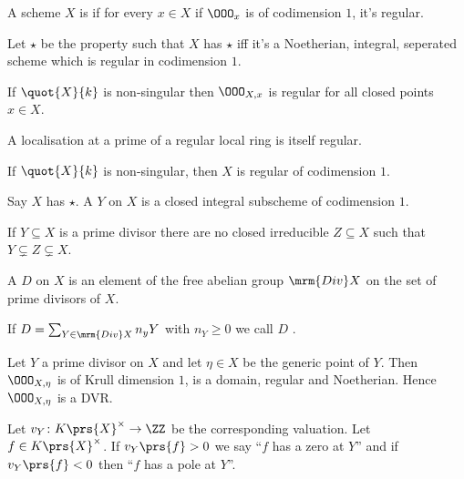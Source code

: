 \documentclass[10pt,a4paper,twoside,openany,hidelinks]{book}
\begin{document}
\begin{definition}
A scheme $X$ is  if for every $x \in X$ if $\OOO_x$ is of codimension $1$, it's regular.
\end{definition}

\begin{notation}
Let $\star$ be the property such that $X$ has $\star$ iff it's a Noetherian, integral, seperated scheme which is regular in codimension $1$.
\end{notation}

\begin{remark}
If $\quot{X}{k}$ is non-singular then $\OOO_{X, x}$ is regular for all closed points $x \in X$.
\end{remark}

\begin{fact}
A localisation at a prime of a regular local ring is itself regular.
\end{fact}

\begin{corollary}
If $\quot{X}{k}$ is non-singular, then $X$ is regular of codimension $1$.
\end{corollary}

\begin{definition}
Say $X$ has $\star$. A  $Y$ on $X$ is a closed integral subscheme of codimension $1$.
\end{definition}

\begin{remark}
If $Y \subseteq X$ is a prime divisor there are no closed irreducible $Z \subseteq X$ such that $Y \subsetneq Z \subsetneq X$.
\end{remark}

\begin{definition}
A  $D$ on $X$ is an element of the free abelian group $\mrm{Div} X$ on the set of prime divisors of $X$.
\end{definition}

\begin{definition}
If $D = \sum_{Y \in \mrm{Div} X} n_y Y$ with $n_Y \geq 0$ we call $D$ .
\end{definition}

\begin{observation}
Let $Y$ a prime divisor on $X$ and let $\eta \in X$ be the generic point of $Y$. Then $\OOO_{X,\eta}$ is of Krull dimension $1$, is a domain, regular and Noetherian. Hence $\OOO_{X,\eta}$ is a DVR.

Let $v_Y \colon K\prs{X}^\times \to \ZZ$ be the corresponding valuation.
Let $f \in K\prs{X}^\times$. If $v_Y\prs{f} > 0$ we say ``$f$ has a zero at $Y$'' and if $v_Y\prs{f} < 0$ then ``$f$ has a pole at $Y$''.
\end{observation}
\end{document}
